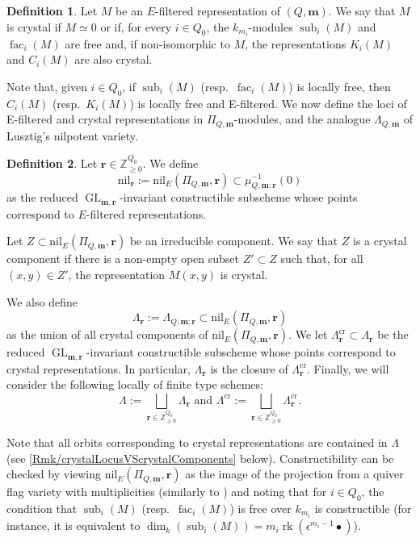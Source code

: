 \documentclass[a4paper,12pt]{article}
\theoremstyle{definition}
\newtheorem{definition}{Definition}[section]
\theoremstyle{plain}
\theoremstyle{remark}
\DeclareMathOperator{\fac}{fac}
\DeclareMathOperator{\GL}{GL}
\DeclareMathOperator{\rk}{rk}
\DeclareMathOperator{\sub}{sub}
\newcommand\bbZ{\mathbb{Z}}
\newcommand\bfm{\mathbf{m}}
\newcommand\bfr{\mathbf{r}}
\begin{document}
\begin{definition}\label{def/crystalRep}
Let $M$ be an $E$-filtered representation of $(Q,\bfm)$. We say that $M$ is crystal if $M\simeq 0$ or if, for every $i\in Q_0$, the $k_{m_i}$-modules $\sub_i(M)$ and $\fac_i(M)$ are free and, if non-isomorphic to $M$, the representations $K_i(M)$ and $C_i(M)$ are also crystal.
\end{definition}

Note that, given $i\in Q_0$, if $\sub_i(M)$ (resp.\ $\fac_i(M)$) is locally free, then $C_i(M)$ (resp.\ $K_i(M)$) is locally free and E-filtered. We now define the loci of E-filtered and crystal representations in $\Pi_{Q,\bfm}$-modules, and the analogue $\Lambda_{Q,\bfm}$ of Lusztig's nilpotent variety.

\begin{definition}\label{def/nilpotentCone}
Let $\bfr\in\bbZ_{\geq0}^{Q_0}$. We define
\[
\mathrm{nil}_{\bfr}:=\mathrm{nil}_E(\Pi_{Q,\bfm},\bfr)\subset\mu_{Q,\bfm;\bfr}^{-1}(0)
\]
as the reduced $\GL_{\bfm,\bfr}$-invariant constructible subscheme whose points correspond to $E$-filtered representations.

Let $Z\subset\mathrm{nil}_E(\Pi_{Q,\bfm},\bfr)$ be an irreducible component. We say that $Z$ is a crystal component if there is a non-empty open subset $Z'\subset Z$ such that, for all $(x,y)\in Z'$, the representation $M(x,y)$ is crystal.

We also define
\[
\Lambda_\bfr:=\Lambda_{Q,\bfm;\bfr}\subset\mathrm{nil}_E(\Pi_{Q,\bfm},\bfr)
\]
as the union of all crystal components of $\mathrm{nil}_E(\Pi_{Q,\bfm},\bfr)$. We let $\Lambda_\bfr^{\mathrm{cr}}\subset\Lambda_\bfr$ be the reduced $\GL_{\bfm,\bfr}$-invariant constructible subscheme whose points correspond to crystal representations. In particular, $\Lambda_\bfr$ is the closure of $\Lambda^{\mathrm{cr}}_\bfr$. Finally, we will consider the following locally of finite type schemes:
\[
\Lambda:=\bigsqcup_{\bfr\in\bbZ_{\geq0}^{Q_0}}\Lambda_\bfr
\text{  and  }
\Lambda^{\mathrm{cr}}:=\bigsqcup_{\bfr\in\bbZ_{\geq0}^{Q_0}}\Lambda_\bfr^{\mathrm{cr}}
.
\]
\end{definition}

Note that all orbits corresponding to crystal representations are contained in $\Lambda$ (see \cref{Rmk/crystalLocusVScrystalComponents} below). Constructibility can be checked by viewing $\mathrm{nil}_E(\Pi_{Q,\bfm},\bfr)$ as the image of the projection from a quiver flag variety with multiplicities (similarly to \cite[\S 1.5]{Lus91}) and noting that for $i\in Q_0$, the condition that $\sub_i(M)$ (resp.\ $\fac_i(M)$) is free over $k_{m_i}$ is constructible (for instance, it is equivalent to $\dim_k\left(\sub_i(M)\right)=m_i\rk(\epsilon^{m_i-1}\bullet)$).
\end{document}
